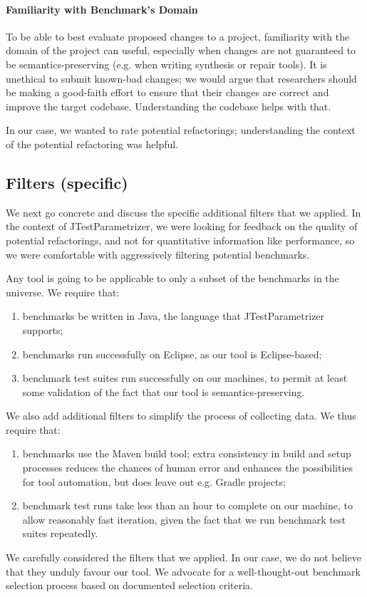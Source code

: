 \paragraph{Familiarity with Benchmark's Domain}
To be able to best evaluate proposed changes to a project, familiarity with the domain of the project can useful, especially when changes are not guaranteed to be semantics-preserving (e.g. when writing synthesis or repair tools). It is unethical to submit known-bad changes; we would argue that researchers should be making a good-faith effort to ensure that their changes are correct and improve the target codebase. Understanding the codebase helps with that.

In our case, we wanted to rate potential refactorings; understanding the context of the potential refactoring was helpful.

\subsection{Filters (specific)}
We next go concrete and discuss the specific additional filters that we applied.
In the context of JTestParametrizer, we were looking for feedback on the quality of potential refactorings, and not for quantitative information like performance, so we were comfortable with aggressively filtering potential benchmarks.

Any tool is going to be applicable to only a subset of the benchmarks in the universe. We require that:
\begin{enumerate}
\item benchmarks be written in Java, the language that JTestParametrizer supports;
\item benchmarks run successfully on Eclipse, as our tool is Eclipse-based;
\item benchmark test suites run successfully on our machines, to permit at least some validation of the fact that our tool is semantics-preserving.
\end{enumerate}
We also add additional filters to simplify the process of collecting data. We thus require that:
\begin{enumerate}
\item benchmarks use the Maven build tool; extra consistency in build and setup processes reduces the chances of human error and enhances the possibilities for tool automation, but does leave out e.g. Gradle projects;
\item benchmark test runs take less than an hour to complete on our machine, to allow reasonably fast iteration, given the fact that we run benchmark test suites repeatedly.
\end{enumerate}
We carefully considered the filters that we applied. In our case, we do not believe that they unduly favour our tool. We advocate for a well-thought-out benchmark selection process based on documented selection criteria.

